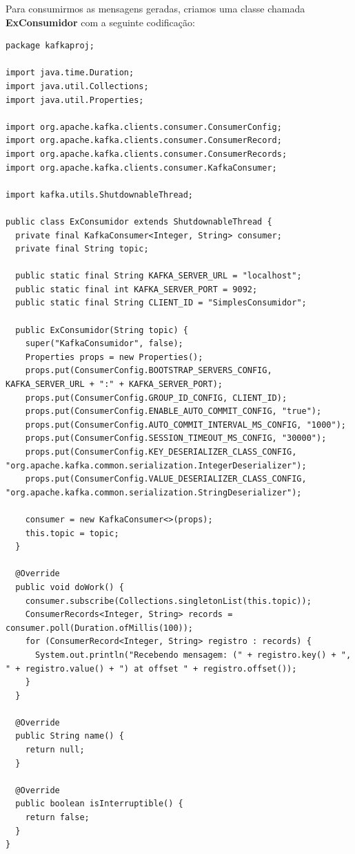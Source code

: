 \documentclass[a4paper,11pt]{article}
\begin{document}
Para consumirmos as mensagens geradas, criamos uma classe chamada \textbf{ExConsumidor} com a seguinte codificação:
\begin{lstlisting}[]
package kafkaproj;

import java.time.Duration;
import java.util.Collections;
import java.util.Properties;

import org.apache.kafka.clients.consumer.ConsumerConfig;
import org.apache.kafka.clients.consumer.ConsumerRecord;
import org.apache.kafka.clients.consumer.ConsumerRecords;
import org.apache.kafka.clients.consumer.KafkaConsumer;

import kafka.utils.ShutdownableThread;

public class ExConsumidor extends ShutdownableThread {
  private final KafkaConsumer<Integer, String> consumer;
  private final String topic;
     
  public static final String KAFKA_SERVER_URL = "localhost";
  public static final int KAFKA_SERVER_PORT = 9092;
  public static final String CLIENT_ID = "SimplesConsumidor";
 
  public ExConsumidor(String topic) {
    super("KafkaConsumidor", false);
    Properties props = new Properties();
    props.put(ConsumerConfig.BOOTSTRAP_SERVERS_CONFIG, KAFKA_SERVER_URL + ":" + KAFKA_SERVER_PORT);
    props.put(ConsumerConfig.GROUP_ID_CONFIG, CLIENT_ID);
    props.put(ConsumerConfig.ENABLE_AUTO_COMMIT_CONFIG, "true");
    props.put(ConsumerConfig.AUTO_COMMIT_INTERVAL_MS_CONFIG, "1000");
    props.put(ConsumerConfig.SESSION_TIMEOUT_MS_CONFIG, "30000");
    props.put(ConsumerConfig.KEY_DESERIALIZER_CLASS_CONFIG, "org.apache.kafka.common.serialization.IntegerDeserializer");
    props.put(ConsumerConfig.VALUE_DESERIALIZER_CLASS_CONFIG, "org.apache.kafka.common.serialization.StringDeserializer");
 
    consumer = new KafkaConsumer<>(props);
    this.topic = topic;
  }
 
  @Override
  public void doWork() {
    consumer.subscribe(Collections.singletonList(this.topic));
    ConsumerRecords<Integer, String> records = consumer.poll(Duration.ofMillis(100));
    for (ConsumerRecord<Integer, String> registro : records) {
      System.out.println("Recebendo mensagem: (" + registro.key() + ", " + registro.value() + ") at offset " + registro.offset());
    }
  }
 
  @Override
  public String name() {
    return null;
  }
 
  @Override
  public boolean isInterruptible() {
    return false;
  }
}
\end{lstlisting}
\end{document}
